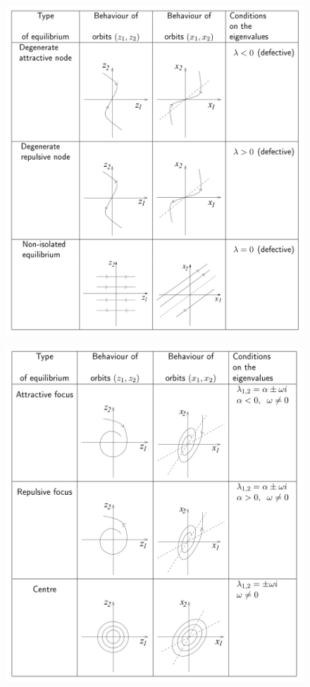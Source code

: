 \documentclass[12pt, openany]{report}
\theoremstyle{definition}
\begin{document}
\begin{figure}[H]
    \centering
    \includegraphics[width = \textwidth]{img/orbit_lin_sys_2.png}
\end{figure}
\begin{figure}[H]
    \centering
    \includegraphics[width = \textwidth]{img/orbit_lin_sys_3.png}
\end{figure}
\end{document}
